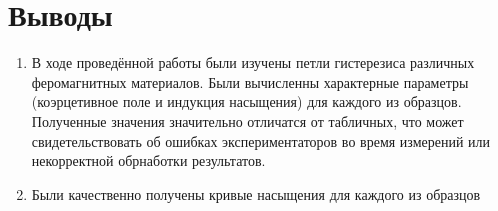 \documentclass{article}
\begin{document}
\section{Выводы}
\begin{enumerate}
    \item В ходе проведённой работы были изучены петли гистерезиса различных феромагнитных материалов.
Были вычисленны характерные параметры (коэрцетивное поле и индукция насыщения) для каждого из образцов.
Полученные значения значительно отличатся от табличных, что может свидетельствовать об ошибках экспериментаторов
во время измерений или некорректной обрнаботки результатов.
    \item Были качественно получены кривые насыщения для каждого из образцов
\end{enumerate}
\end{document}
